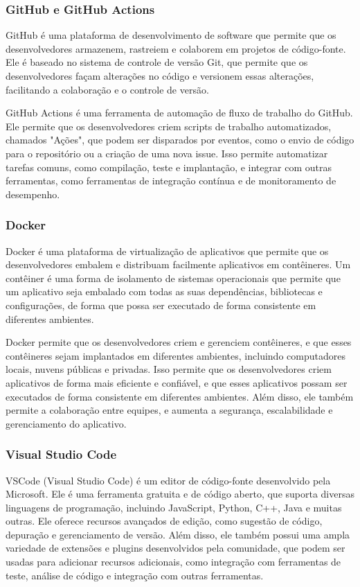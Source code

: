 \subsubsection{GitHub e GitHub Actions}

GitHub é uma plataforma de desenvolvimento de software que permite que os desenvolvedores armazenem, rastreiem e colaborem em projetos de código-fonte. Ele é baseado no sistema de controle de versão Git, que permite que os desenvolvedores façam alterações no código e versionem essas alterações, facilitando a colaboração e o controle de versão.

GitHub Actions é uma ferramenta de automação de fluxo de trabalho do GitHub. Ele permite que os desenvolvedores criem scripts de trabalho automatizados, chamados "Ações", que podem ser disparados por eventos, como o envio de código para o repositório ou a criação de uma nova issue. Isso permite automatizar tarefas comuns, como compilação, teste e implantação, e integrar com outras ferramentas, como ferramentas de integração contínua e de monitoramento de desempenho.

\subsubsection{Docker}

Docker é uma plataforma de virtualização de aplicativos que permite que os desenvolvedores embalem e distribuam facilmente aplicativos em contêineres. Um contêiner é uma forma de isolamento de sistemas operacionais que permite que um aplicativo seja embalado com todas as suas dependências, bibliotecas e configurações, de forma que possa ser executado de forma consistente em diferentes ambientes.

Docker permite que os desenvolvedores criem e gerenciem contêineres, e que esses contêineres sejam implantados em diferentes ambientes, incluindo computadores locais, nuvens públicas e privadas. Isso permite que os desenvolvedores criem aplicativos de forma mais eficiente e confiável, e que esses aplicativos possam ser executados de forma consistente em diferentes ambientes. Além disso, ele também permite a colaboração entre equipes, e aumenta a segurança, escalabilidade e gerenciamento do aplicativo.

\subsubsection{Visual Studio Code}

VSCode (Visual Studio Code) é um editor de código-fonte desenvolvido pela Microsoft. Ele é uma ferramenta gratuita e de código aberto, que suporta diversas linguagens de programação, incluindo JavaScript, Python, C++, Java e muitas outras. Ele oferece recursos avançados de edição, como sugestão de código, depuração e gerenciamento de versão. Além disso, ele também possui uma ampla variedade de extensões e plugins desenvolvidos pela comunidade, que podem ser usadas para adicionar recursos adicionais, como integração com ferramentas de teste, análise de código e integração com outras ferramentas.


